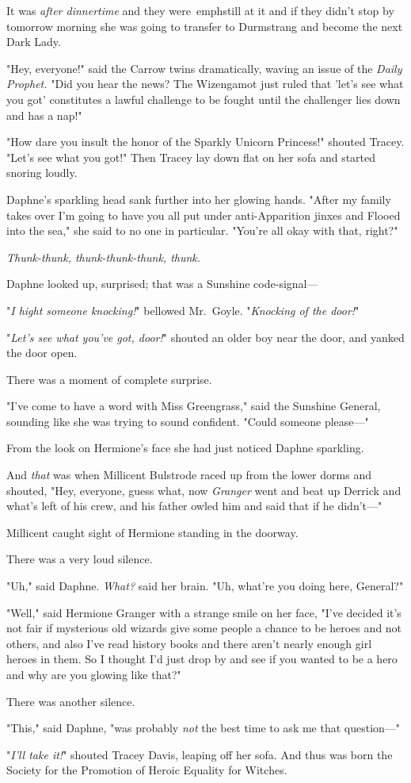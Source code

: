 It was \emph{after dinnertime} and they were\ emph{still at it} and if they 
didn't stop by tomorrow morning she was going to transfer to Durmstrang and 
become the next Dark Lady.

"Hey, everyone!" said the Carrow twins dramatically, waving an issue of the 
\emph{Daily Prophet.} "Did you hear the news? The Wizengamot just ruled that 
'let's see what you got' constitutes a lawful challenge to be fought until the 
challenger lies down and has a nap!"

"How dare you insult the honor of the Sparkly Unicorn Princess!" shouted 
Tracey. "Let's see what you got!" Then Tracey lay down flat on her sofa and 
started snoring loudly.

Daphne's sparkling head sank further into her glowing hands. "After my family 
takes over I'm going to have you all put under anti-Apparition jinxes and 
Flooed into the sea," she said to no one in particular. "You're all okay with 
that, right?"

\emph{Thunk-thunk, thunk-thunk-thunk, thunk.}

Daphne looked up, surprised; that was a Sunshine code-signal---

"\emph{I hight someone knocking!}" bellowed Mr.~Goyle. "\emph{Knocking of the 
door!}"

"\emph{Let's see what you've got, door!}" shouted an older boy near the door, 
and yanked the door open.

There was a moment of complete surprise.

"I've come to have a word with Miss Greengrass," said the Sunshine General, 
sounding like she was trying to sound confident. "Could someone please---"

From the look on Hermione's face she had just noticed Daphne sparkling.

And \emph{that} was when Millicent Bulstrode raced up from the lower dorms and 
shouted, "Hey, everyone, guess what, now \emph{Granger} went and beat up 
Derrick and what's left of his crew, and his father owled him and said that if 
he didn't---"

Millicent caught sight of Hermione standing in the doorway.

There was a very loud silence.

"Uh," said Daphne. \emph{What?} said her brain. "Uh, what're you doing here, 
General?"

"Well," said Hermione Granger with a strange smile on her face, "I've decided 
it's not fair if mysterious old wizards give some people a chance to be heroes 
and not others, and also I've read history books and there aren't nearly enough 
girl heroes in them. So I thought I'd just drop by and see if you wanted to be 
a hero and why are you glowing like that?"

There was another silence.

"This," said Daphne, "was probably \emph{not} the best time to ask me that 
question---"

"\emph{I'll take it!}" shouted Tracey Davis, leaping off her sofa.
\sbreak
And thus was born the Society for the Promotion of Heroic Equality for Witches.
